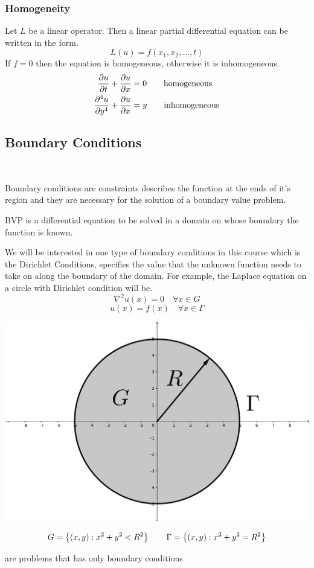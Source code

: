 \documentclass[]{article}
\begin{document}
\subsubsection{Homogeneity}
Let $L$ be a linear operator. Then a linear partial differential equation can be written in the form.
\[
    L(u) = f(x_1,x_2, \dots , t)    
\]
If $f = 0$ then the equation is homogeneous, otherwise it is inhomogeneous.
\begin{align*}
\frac{\partial u}{\partial t} + \frac{\partial u}{\partial x} &= 0 \quad\quad \text{homogeneous}
\\
\frac{\partial^4 u}{\partial y^4} + \frac{\partial u}{\partial x} &= y \quad\quad \text{inhomogeneous}
\end{align*}

\newpage

\subsection{Boundary Conditions}
\
\begin{definition}
    Boundary conditions are constraints describes the function at the ends of it's region and they are necessary for the solution of a boundary value problem.
\end{definition}
\begin{definition}
    BVP is a differential equation to be solved in a domain on whose boundary the function is known.
\end{definition}
We will be interested in one type of boundary conditions in this course which is the Dirichlet Conditions, specifies the value that the unknown function needs to take on along the boundary of the domain. For example, the Laplace equation on a circle with Dirichlet condition will be.
\[
    \nabla^2 u(x) = 0 \quad \forall x \in G    
\]
\[
    u(x) = f(x) \quad \forall x \in \Gamma    
\]
\begin{center}
\includegraphics[scale=0.1]{laplacecircle.png} 
\end{center}
\[
    G = \left\lbrace (x,y):x^2+y^2 < R^2 \right\rbrace  \quad\quad \Gamma = \left\lbrace (x,y):x^2+y^2 = R^2 \right\rbrace    
\]
\begin{definition}
    are problems that has only boundary conditions
\end{definition}
\end{document}
